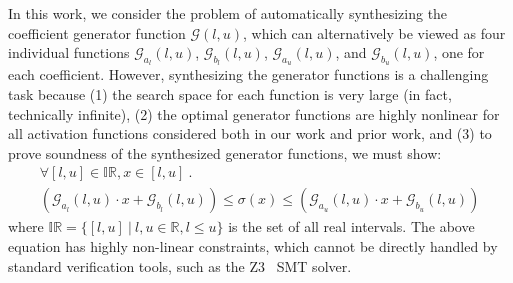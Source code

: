 In this work, we consider the problem of automatically synthesizing the coefficient generator function
$\mathcal{G}(l, u) $, which can alternatively be viewed as four individual
functions $\mathcal{G}_{a_l}(l,u)$, $\mathcal{G}_{b_l}(l,u)$,
$\mathcal{G}_{a_u}(l,u)$, and $\mathcal{G}_{b_u}(l,u)$, one
for each
coefficient.
However, synthesizing the generator functions is a challenging task because (1)
the search space for each function is very large (in fact, technically
infinite), (2) the optimal generator functions are highly nonlinear for all
activation functions considered both in our work and prior work, and (3) to
prove soundness of the synthesized generator functions, we must show:
\begin{equation}
\begin{gathered}\label{offlinesyn:eq:intro-sound}
\forall [l, u] \in \mathbb{IR}, x \in [l, u] ~.\\
(\mathcal{G}_{a_l}(l,u) \cdot x + \mathcal{G}_{b_l}(l,u))
\leq \sigma(x) \leq
(\mathcal{G}_{a_u}(l,u) \cdot x + \mathcal{G}_{b_u}(l,u))
\end{gathered}
\end{equation}
where $ \mathbb{IR} = \{[l, u] ~|~ l, u \in \mathbb{R}, l \leq u \} $ is the
set of all real intervals. The above equation has
highly non-linear constraints, which cannot be directly handled by
standard verification tools, such as the Z3~\cite{de2008z3} SMT solver.



